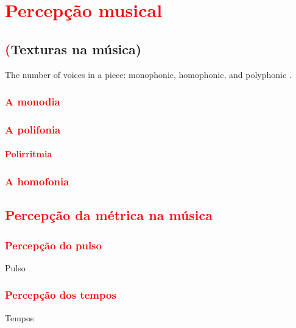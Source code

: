 
\chapter{\textcolor{red}{Percepção musical}}


\section{\textcolor{red}(Texturas na música)}
The number of voices in a
piece: monophonic, homophonic, and
polyphonic \cite[pp. 322]{harnum2009basic}.

\subsection{\textcolor{red}{A monodia}}
\cite[pp. 38]{schurmann1989m}

\subsection{\textcolor{red}{A polifonia}}
\cite[pp. 64]{schurmann1989m}
\subsubsection{\textcolor{red}{Polirritmia}}
\cite[pp. 93]{alves2004teoria}

\subsection{\textcolor{red}{A homofonia}}
\cite[pp. 121]{schurmann1989m}




\section{\textcolor{red}{Percepção da métrica na música}}

\subsection{\textcolor{red}{Percepção do pulso}}
Pulso


\subsection{\textcolor{red}{Percepção dos tempos}}
Tempos


